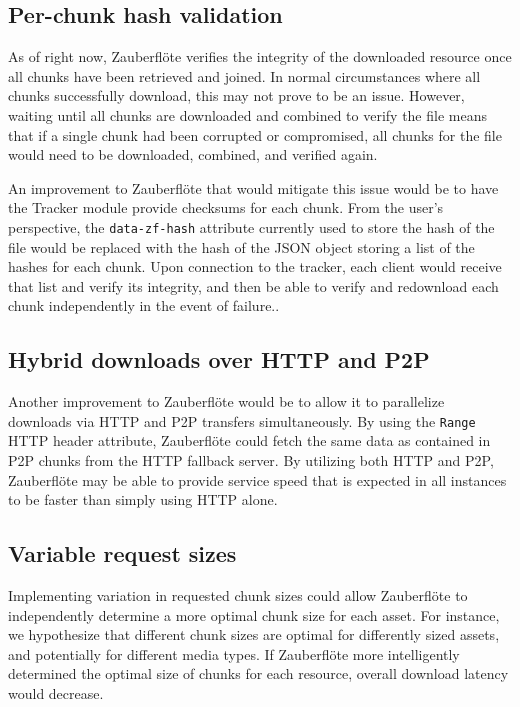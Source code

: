 \documentclass[letterpaper,twocolumn,10pt]{article}
\newcommand{\zbf}{Zauberfl\"{o}te\xspace}
\begin{document}
\subsection{Per-chunk hash validation}
As of right now, \zbf verifies the integrity of the downloaded resource once all chunks have been retrieved and joined. In normal circumstances where all chunks successfully download, this may not prove to be an issue. However, waiting until all chunks are downloaded and combined to verify the file means that if a single chunk had been corrupted or compromised, all chunks for the file would need to be downloaded, combined, and verified again.

An improvement to \zbf that would mitigate this issue would be to have the Tracker module provide checksums for each chunk. From the user's perspective, the \texttt{data-zf-hash} attribute currently used to store the hash of the file would be replaced with the hash of the JSON object storing a list of the hashes for each chunk. Upon connection to the tracker, each client would receive that list and verify its integrity, and then be able to verify and redownload each chunk independently in the event of failure..

\subsection{Hybrid downloads over HTTP and P2P}

Another improvement to \zbf would be to allow it to parallelize downloads via HTTP and P2P transfers simultaneously. By using the \texttt{Range} HTTP header attribute, \zbf could fetch the same data as contained in P2P chunks from the HTTP fallback server. By utilizing both HTTP and P2P, \zbf may be able to provide service speed that is expected in all instances to be faster than simply using HTTP alone.

\subsection{Variable request sizes}

Implementing variation in requested chunk sizes could allow \zbf to independently
determine a more optimal chunk size for each asset. For instance, we hypothesize
that different chunk sizes are optimal for differently sized assets, and potentially
for different media types. If \zbf more intelligently determined the optimal size
of chunks for each resource, overall download latency would decrease.
\end{document}
